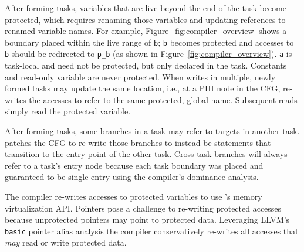 After forming tasks, variables that are live beyond the end of the task become
protected, which requires renaming those variables and updating references to
renamed variable names. For example, Figure~\ref{fig:compiler_overview} shows a
boundary placed within the live range of {\tt b}; {\tt b} becomes protected and
accesses to {\tt b} should be redirected to {\tt p\_b} (as shown in
Figure~\ref{fig:compiler_overview}). {\tt a} is task-local and need not be
protected, but only declared in the task. Constants and read-only variable are
never protected. When writes in multiple, newly formed tasks may update the
same location, i.e., at a PHI node in the CFG, \sys re-writes the accesses to
refer to the same protected, global name. Subsequent reads simply read the
protected variable.

After forming tasks, some branches in a task may refer to targets in another
task. \sys patches the CFG to re-write those branches to instead be \transition
statements that transition to the entry point of the other task.  Cross-task
branches will always refer to a task's entry node because each task boundary
was placed and guaranteed to be single-entry using the compiler's dominance
analysis.

The compiler re-writes accesses to protected variables to use \sys's memory
virtualization API. Pointers pose a challenge to re-writing protected accesses
because unprotected pointers may point to protected data. Leveraging LLVM's
{\tt basic} pointer alias analysis the compiler conservatively re-writes all
accesses that {\em may} read or write protected data. 


